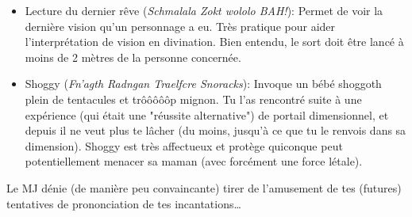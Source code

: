 {\begin{itemize}
		\item Lecture du dernier rêve (\emph{Schmalala Zokt wololo BAH!}): Permet de voir la dernière vision qu'un personnage a eu. Très pratique pour aider l'interprétation de vision en divination. Bien entendu, le sort doit être lancé à moins de 2 mètres de la personne concernée.
		
		\item Shoggy (\emph{Fn'agth Radngan Traelfcre Snoracks}): Invoque un bébé shoggoth plein de tentacules et trôôôôôp mignon. Tu l'as rencontré suite à une expérience (qui était une "réussite alternative") de portail dimensionnel, et depuis il ne veut plus te lâcher (du moins, jusqu'à ce que tu le renvois dans sa dimension). Shoggy est très affectueux et protège quiconque peut potentiellement menacer sa maman (avec forcément une force létale).
	\end{itemize}
	
	\par Le MJ dénie (de manière peu convaincante) tirer de l'amusement de tes (futures) tentatives de prononciation de tes incantations\dots
}









